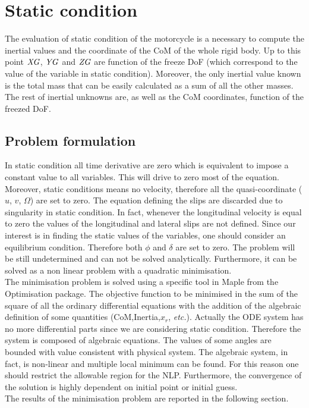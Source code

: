 \section{Static condition}
%
The evaluation of static condition of the motorcycle is a necessary to compute the inertial values and the coordinate of the CoM of the whole rigid body. Up to this point ${\it XG}$, ${\it YG}$ and ${\it ZG}$ are function of the freeze DoF (which correspond to the value of the variable in static condition). Moreover, the only inertial value known is the total mass that can be easily calculated as a sum of all the other masses. The rest of inertial unknowns are, as well as the CoM coordinates, function of the freezed DoF.  
%
\subsection{Problem formulation}
%
In static condition all time derivative are zero which is equivalent to impose a constant value to all variables. This will drive to zero most of the equation. Moreover, static conditions means no velocity, therefore all the quasi-coordinate ($u$, $v$, $\Omega$) are set to zero. The equation defining the slips are discarded due to singularity in static condition. In fact, whenever the longitudinal velocity is equal to zero the values of the longitudinal and lateral slips are not defined. Since our interest is in finding the static values of the variables, one should consider an equilibrium condition. Therefore both $\phi$ and $\delta$ are set to zero. The problem will be still undetermined and can not be solved analytically. Furthermore, it can be solved as a non linear problem with a quadratic minimisation.\\
The minimisation problem is solved using a specific tool in Maple from the Optimisation package.
The objective function to be minimised in the sum of the square of all the ordinary differential equations with the addition of the algebraic definition of some quantities (CoM,Inertia,$x_r$, \textit{etc.}). Actually the ODE system has no more differential parts since we are considering static condition. Therefore the system is composed of algebraic equations. The values of some angles are bounded with value consistent with physical system. The algebraic system, in fact, is non-linear and multiple local minimum can be found. For this reason one should restrict the allowable region for the NLP. Furthermore, the convergence of the solution is highly dependent on initial point or initial guess.\\
The results of the minimisation problem are reported in the following section.
%
